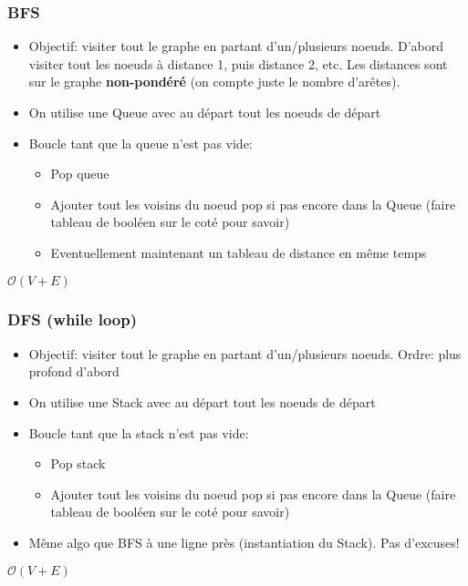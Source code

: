 \documentclass[8pt,aspectratio=169]{beamer}
\begin{document}
\begin{frame}
\frametitle{BFS}
\begin{itemize}
	\item Objectif: visiter tout le graphe en partant d'un/plusieurs noeuds. D'abord visiter tout les noeuds à distance 1, puis distance 2, etc. Les distances sont sur le graphe \textbf{non-pondéré} (on compte juste le nombre d'arêtes).
	\item On utilise une Queue avec au départ tout les noeuds de départ
	\item Boucle tant que la queue n'est pas vide:
		\begin{itemize}
			\item Pop queue
			\item Ajouter tout les voisins du noeud pop si pas encore dans la Queue (faire tableau de booléen sur le coté pour savoir)
			\item Eventuellement maintenant un tableau de distance en même temps
		\end{itemize}
\end{itemize}
$\mathcal{O}(V+E)$
\end{frame}

\begin{frame}
\frametitle{DFS (while loop)}
\begin{itemize}
	\item Objectif: visiter tout le graphe en partant d'un/plusieurs noeuds. Ordre: plus profond d'abord
	\item On utilise une Stack avec au départ tout les noeuds de départ
	\item Boucle tant que la stack n'est pas vide:
	\begin{itemize}
		\item Pop stack
		\item Ajouter tout les voisins du noeud pop si pas encore dans la Queue (faire tableau de booléen sur le coté pour savoir)
	\end{itemize}
	\item Même algo que BFS à une ligne près (instantiation du Stack). Pas d'excuses!
\end{itemize}
$\mathcal{O}(V+E)$
\end{frame}
\end{document}
